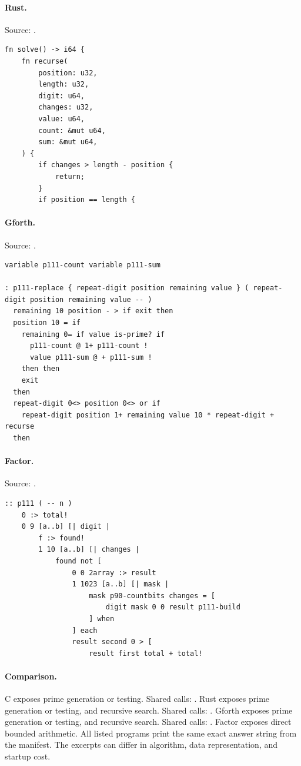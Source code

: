 \paragraph{Rust.} Source: .
\begin{lstlisting}
fn solve() -> i64 {
    fn recurse(
        position: u32,
        length: u32,
        digit: u64,
        changes: u32,
        value: u64,
        count: &mut u64,
        sum: &mut u64,
    ) {
        if changes > length - position {
            return;
        }
        if position == length {
\end{lstlisting}

\paragraph{Gforth.} Source: .
\begin{lstlisting}
variable p111-count variable p111-sum

: p111-replace { repeat-digit position remaining value } ( repeat-digit position remaining value -- )
  remaining 10 position - > if exit then
  position 10 = if
    remaining 0= if value is-prime? if
      p111-count @ 1+ p111-count !
      value p111-sum @ + p111-sum !
    then then
    exit
  then
  repeat-digit 0<> position 0<> or if
    repeat-digit position 1+ remaining value 10 * repeat-digit + recurse
  then
\end{lstlisting}

\paragraph{Factor.} Source: .
\begin{lstlisting}
:: p111 ( -- n )
    0 :> total!
    0 9 [a..b] [| digit |
        f :> found!
        1 10 [a..b] [| changes |
            found not [
                0 0 2array :> result
                1 1023 [a..b] [| mask |
                    mask p90-countbits changes = [
                        digit mask 0 0 result p111-build
                    ] when
                ] each
                result second 0 > [
                    result first total + total!
\end{lstlisting}

\paragraph{Comparison.}
C exposes prime generation or testing. Shared calls: \texttt{}. Rust exposes prime generation or testing, and recursive search. Shared calls: \texttt{}. Gforth exposes prime generation or testing, and recursive search. Shared calls: \texttt{}. Factor exposes direct bounded arithmetic.
All listed programs print the same exact answer string from the manifest. The excerpts can differ in algorithm, data representation, and startup cost.

